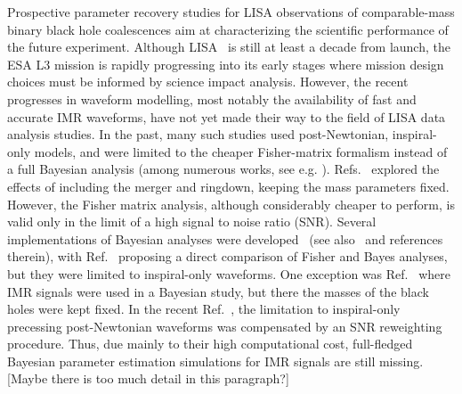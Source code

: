 \documentclass[aps,showpacs,twocolumn,
prd,superscriptaddress,nofootinbib]{revtex4-1}
\newcommand{\jgb}[1]{{\color{DarkGreen} #1}}
\begin{document}
Prospective parameter recovery studies for LISA observations of comparable-mass binary black hole coalescences aim at characterizing the scientific performance of the future experiment. Although LISA~\cite{LISA17} is still at least a decade from launch, the ESA L3 mission is rapidly progressing into its early stages where mission design choices must be informed by science impact analysis. However, the recent progresses in waveform modelling, most notably the availability of fast and accurate IMR waveforms, have not yet made their way to the field of LISA data analysis studies. In the past, many such studies used post-Newtonian, inspiral-only models, and were limited to the cheaper Fisher-matrix formalism instead of a full Bayesian analysis (among numerous works, see e.g. \cite{Cutler97,LISAPE09}). Refs.~\cite{McWilliams+09,McWilliams+10,McWilliams+11} explored the effects of including the merger and ringdown, keeping the mass parameters fixed. However, the Fisher matrix analysis, although considerably cheaper to perform, is valid only in the limit of a high signal to noise ratio (SNR). Several implementations of Bayesian analyses were developed~\cite{CP06,Wickham+06,Babak+08,GP09,Feroz+09,Petiteau+10,PC13} (see also~\cite{MLDC4} and references therein), with Ref.~\cite{PC15} proposing a direct comparison of Fisher and Bayes analyses, but they were limited to inspiral-only waveforms. One exception was Ref.~\cite{Babak+08} where IMR signals were used in a Bayesian study, but there the masses of the black holes were kept fixed. In the recent Ref.~\cite{Klein+15}, the limitation to inspiral-only precessing post-Newtonian waveforms was compensated by an SNR reweighting procedure. Thus, due mainly to their high computational cost, full-fledged Bayesian parameter estimation simulations for IMR signals are still missing. \jgb{[Maybe there is too much detail in this paragraph?]}
\end{document}
